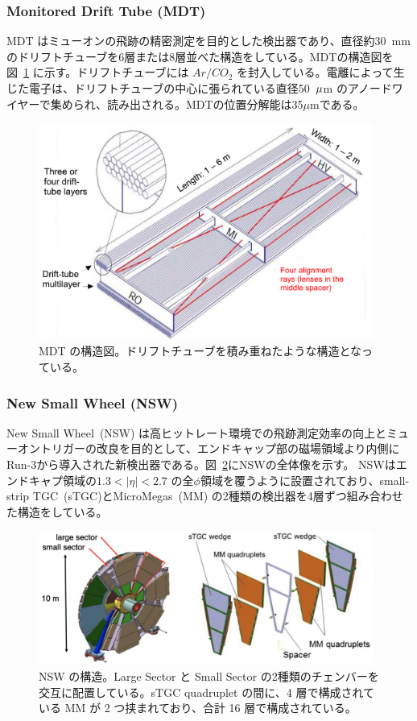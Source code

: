 \subsubsection{Monitored Drift Tube (MDT)}
MDT はミューオンの飛跡の精密測定を目的とした検出器であり、直径約30~mmのドリフトチューブを6層または8層並べた構造をしている。MDTの構造図を図~\ref{fig:MDT} に示す。ドリフトチューブには $Ar/CO_2$ を封入している。電離によって生じた電子は、ドリフトチューブの中心に張られている直径50~$\rm{\mu}$m のアノードワイヤーで集められ、読み出される。MDTの位置分解能は35$\mu$mである。

\begin{figure}[tb]
  \centering
  \includegraphics[clip, width=11cm]{fig/2/MDT_chamber_schematics_2.pdf}
  \caption{MDT の構造図\cite{Aad:1129811}。ドリフトチューブを積み重ねたような構造となっている。}
  \label{fig:MDT}
\end{figure}


\subsubsection{New Small Wheel (NSW)}
New Small Wheel~(NSW) は高ヒットレート環境での飛跡測定効率の向上とミューオントリガーの改良を目的として、エンドキャップ部の磁場領域より内側にRun-3から導入された新検出器である\cite{article:NSW_tech}。図~\ref{fig:NSW}にNSWの全体像を示す。
NSWはエンドキャプ領域の$1.3 < |\eta| < 2.7$ の全$\phi$領域を覆うように設置されており、small-strip TGC~(sTGC)とMicroMegas~(MM) の2種類の検出器を4層ずつ組み合わせた構造をしている。
\begin{figure}[tb]
  \centering
  \includegraphics[clip, width=11cm]{fig/2/nsw-structure.png}
  \caption{NSW の構造\cite{article:NSW}。Large Sector と Small Sector の2種類のチェンバーを交互に配置している。sTGC quadruplet の間に、4 層で構成されている MM が 2 つ挟まれており、合計 16 層で構成されている。}
  \label{fig:NSW}
\end{figure}

